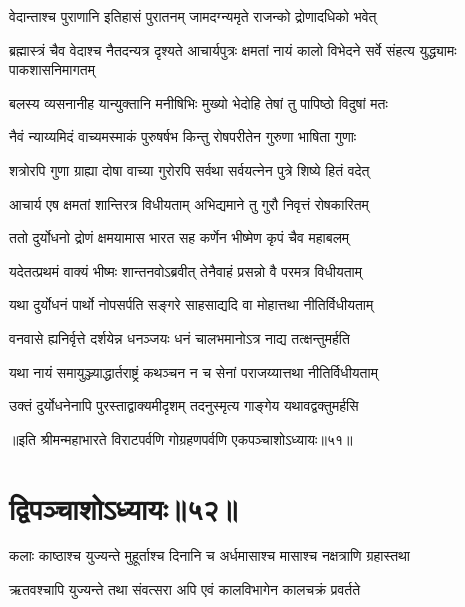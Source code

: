 \twolineshloka
{वेदान्ताश्च पुराणानि इतिहासं पुरातनम्}
{जामदग्न्यमृते राजन्को द्रोणादधिको भवेत्}


\onelineshloka
{ब्रह्मास्त्रं चैव वेदाश्च नैतदन्यत्र दृश्यते}
\twolineshloka
{आचार्यपुत्रः क्षमतां नायं कालो विभेदने}
{सर्वे संहत्य युद्ध्यामः पाकशासनिमागतम्}


\twolineshloka
{बलस्य व्यसनानीह यान्युक्तानि मनीषिभिः}
{मुख्यो भेदोहि तेषां तु पापिष्ठो विदुषां मतः}




\twolineshloka
{नैवं न्याय्यमिदं वाच्यमस्माकं पुरुषर्षभ}
{किन्तु रोषपरीतेन गुरुणा भाषिता गुणाः}


\twolineshloka
{शत्रोरपि गुणा ग्राह्या दोषा वाच्या गुरोरपि}
{सर्वथा सर्वयत्नेन पुत्रे शिष्ये हितं वदेत्}


\twolineshloka
{आचार्य एष क्षमतां शान्तिरत्र विधीयताम्}
{अभिद्यमाने तु गुरौ निवृत्तं रोषकारितम्}



\twolineshloka
{ततो दुर्योधनो द्रोणं क्षमयामास भारत}
{सह कर्णेन भीष्मेण कृपं चैव महाबलम्}




\twolineshloka
{यदेतत्प्रथमं वाक्यं भीष्मः शान्तनवोऽब्रवीत्}
{तेनैवाहं प्रसन्नो वै परमत्र विधीयताम्}


\twolineshloka
{यथा दुर्योधनं पार्थो नोपसर्पति सङ्गरे}
{साहसाद्यदि वा मोहात्तथा नीतिर्विधीयताम्}


\twolineshloka
{वनवासे ह्यनिर्वृत्ते दर्शयेन्न धनञ्जयः}
{धनं चालभमानोऽत्र नाद्य तत्क्षन्तुमर्हति}


\twolineshloka
{यथा नायं समायुञ्ज्याद्धार्तराष्ट्रं कथञ्चन}
{न च सेनां पराजय्यात्तथा नीतिर्विधीयताम्}


\twolineshloka
{उक्तं दुर्योधनेनापि पुरस्ताद्वाक्यमीदृशम्}
{तदनुस्मृत्य गाङ्गेय यथावद्वक्तुमर्हसि}

॥इति श्रीमन्महाभारते विराटपर्वणि गोग्रहणपर्वणि एकपञ्चाशोऽध्यायः॥५१॥

\chapter{द्विपञ्चाशोऽध्यायः॥५२॥}

\twolineshloka
{कलाः काष्ठाश्च युज्यन्ते मुहूर्ताश्च दिनानि च}
{अर्धमासाश्च मासाश्च नक्षत्राणि ग्रहास्तथा}


\twolineshloka
{ऋतवश्चापि युज्यन्ते तथा संवत्सरा अपि}
{एवं कालविभागेन कालचक्रं प्रवर्तते}


